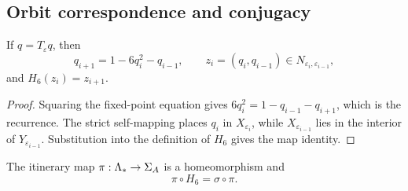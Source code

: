 \subsection{Orbit correspondence and conjugacy}

\begin{lemma}
\label{lem:proof-orbit}
If $q=T_\varepsilon q$, then
\[
 q_{i+1}=1-6q_i^2-q_{i-1},\qquad
 z_i=(q_i,q_{i-1})\in N_{\varepsilon_i,\varepsilon_{i-1}},
\]
and $H_6(z_i)=z_{i+1}$.
\end{lemma}

\begin{proof}
Squaring the fixed-point equation gives
$6q_i^2=1-q_{i-1}-q_{i+1}$, which is the recurrence.  The strict
self-mapping places $q_i$ in $X_{\varepsilon_i}$, while
$X_{\varepsilon_{i-1}}$ lies in the interior of
$Y_{\varepsilon_{i-1}}$.  Substitution into the definition of $H_6$ gives the
map identity.
\end{proof}

\begin{lemma}
\label{lem:proof-conjugacy}
The itinerary map $\pi:\Lambda_*\to\Sigma_A$ is a homeomorphism and
\[
 \pi\circ H_6=\sigma\circ\pi.
\]
\end{lemma}

